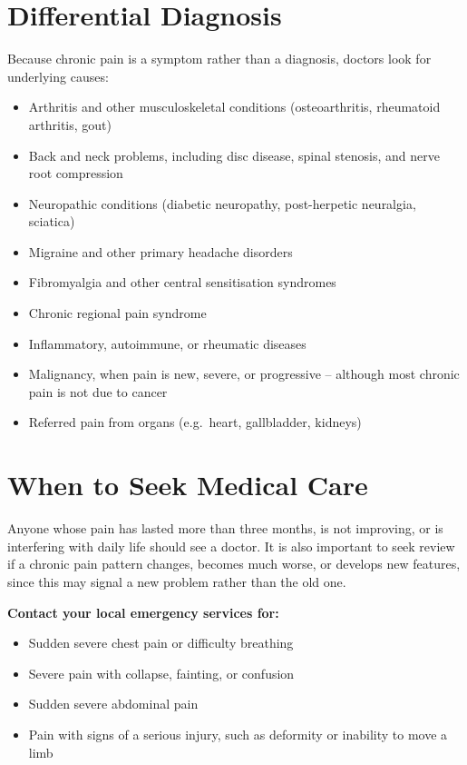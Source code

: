 \section*{Differential Diagnosis}
Because chronic pain is a symptom rather than a diagnosis, doctors look for underlying causes:

\begin{itemize}
    \item Arthritis and other musculoskeletal conditions (osteoarthritis, rheumatoid arthritis, gout)
    \item Back and neck problems, including disc disease, spinal stenosis, and nerve root compression
    \item Neuropathic conditions (diabetic neuropathy, post-herpetic neuralgia, sciatica)
    \item Migraine and other primary headache disorders
    \item Fibromyalgia and other central sensitisation syndromes
    \item Chronic regional pain syndrome
    \item Inflammatory, autoimmune, or rheumatic diseases
    \item Malignancy, when pain is new, severe, or progressive -- although most chronic pain is not due to cancer
    \item Referred pain from organs (e.g.\ heart, gallbladder, kidneys)
\end{itemize}

\section*{When to Seek Medical Care}
Anyone whose pain has lasted more than three months, is not improving, or is interfering with daily life should see a doctor. It is also important to seek review if a chronic pain pattern changes, becomes much worse, or develops new features, since this may signal a new problem rather than the old one.

\textbf{Contact your local emergency services for:}
\begin{itemize}
    \item Sudden severe chest pain or difficulty breathing
    \item Severe pain with collapse, fainting, or confusion
    \item Sudden severe abdominal pain
    \item Pain with signs of a serious injury, such as deformity or inability to move a limb
\end{itemize}

